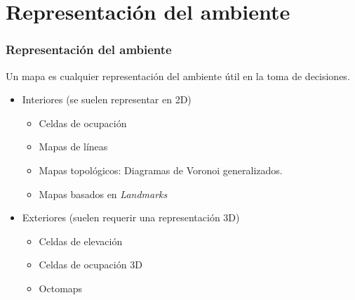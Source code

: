 \section{Representación del ambiente}
\begin{frame}\frametitle{Representación del ambiente}
  Un mapa es cualquier representación del ambiente útil en la toma de decisiones.
  \begin{itemize}
  \item Interiores (se suelen representar en 2D)
    \begin{itemize}
    \item Celdas de ocupación
    \item Mapas de líneas
    \item Mapas topológicos: Diagramas de Voronoi generalizados. 
    \item Mapas basados en \textit{Landmarks}
    \end{itemize}
  \item Exteriores (suelen requerir una representación 3D)
    \begin{itemize}
    \item Celdas de elevación
    \item Celdas de ocupación 3D
    \item Octomaps
    \end{itemize}
  \end{itemize}
\end{frame}

